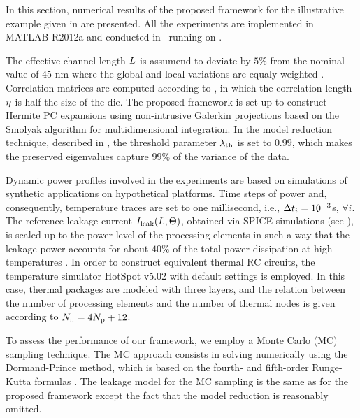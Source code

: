 In this section, numerical results of the proposed framework for the illustrative example given in  are presented. All the experiments are implemented in MATLAB R2012a \cite{matlab} and conducted in \hostOS\ running on \hostHardware.

The effective channel length $L$ is assumend to deviate by $5\%$ from the nominal value of $45$ nm where the global and local variations are equaly weighted \cite{juan2012}. Correlation matrices are computed according to , in which the correlation length $\eta$ is half the size of the die. The proposed framework is set up to construct Hermite PC expansions using non-intrusive Galerkin projections based on the Smolyak algorithm for multidimensional integration. In the model reduction technique, described in , the threshold parameter $\lambda_\text{th}$ is set to $0.99$, which makes the preserved eigenvalues capture $99\%$ of the variance of the data.

Dynamic power profiles involved in the experiments are based on simulations of synthetic applications on hypothetical platforms. Time steps of power and, consequently, temperature traces are set to one millisecond, i.e., $\Delta t_i = 10^{-3}$s, $\forall i$. The reference leakage current $I_{\text{leak}}(L, \Theta)$, obtained via SPICE simulations (see ), is scaled up to the power level of the processing elements in such a way that the leakage power accounts for about $40\%$ of the total power dissipation at high temperatures \cite{liu2007}. In order to construct equivalent thermal RC circuits, the temperature simulator HotSpot v5.02 \cite{hotspot} with default settings is employed. In this case, thermal packages are modeled with three layers, and the relation between the number of processing elements and the number of thermal nodes is given according to $N_\text{n} = 4 {N_\text{p}} + 12$.

To assess the performance of our framework, we employ a Monte Carlo (MC) sampling technique. The MC approach consists in solving  numerically using the Dormand-Prince method, which is based on the fourth- and fifth-order Runge-Kutta formulas \cite{press2007}. The leakage model for the MC sampling is the same as for the proposed framework except the fact that the model reduction is reasonably omitted.

